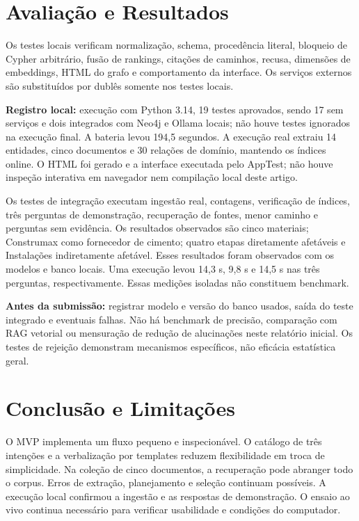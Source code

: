 \documentclass[conference]{IEEEtran}
\begin{document}
\section{Avaliação e Resultados}
Os testes locais verificam normalização, schema, procedência literal, bloqueio de Cypher arbitrário, fusão de rankings, citações de caminhos, recusa, dimensões de embeddings, HTML do grafo e comportamento da interface. Os serviços externos são substituídos por dublês somente nos testes locais.

\textbf{Registro local:} execução com Python 3.14, 19 testes aprovados, sendo 17 sem serviços e dois integrados com Neo4j e Ollama locais; não houve testes ignorados na execução final. A bateria levou 194,5 segundos. A execução real extraiu 14 entidades, cinco documentos e 30 relações de domínio, mantendo os índices online. O HTML foi gerado e a interface executada pelo AppTest; não houve inspeção interativa em navegador nem compilação local deste artigo.

Os testes de integração executam ingestão real, contagens, verificação de índices, três perguntas de demonstração, recuperação de fontes, menor caminho e perguntas sem evidência. Os resultados observados são cinco materiais; Construmax como fornecedor de cimento; quatro etapas diretamente afetáveis e Instalações indiretamente afetável. Esses resultados foram observados com os modelos e banco locais. Uma execução levou 14,3 s, 9,8 s e 14,5 s nas três perguntas, respectivamente. Essas medições isoladas não constituem benchmark.

\textbf{Antes da submissão:} registrar modelo e versão do banco usados, saída do teste integrado e eventuais falhas. Não há benchmark de precisão, comparação com RAG vetorial ou mensuração de redução de alucinações neste relatório inicial. Os testes de rejeição demonstram mecanismos específicos, não eficácia estatística geral.

\section{Conclusão e Limitações}
O MVP implementa um fluxo pequeno e inspecionável. O catálogo de três intenções e a verbalização por templates reduzem flexibilidade em troca de simplicidade. Na coleção de cinco documentos, a recuperação pode abranger todo o corpus. Erros de extração, planejamento e seleção continuam possíveis. A execução local confirmou a ingestão e as respostas de demonstração. O ensaio ao vivo continua necessário para verificar usabilidade e condições do computador.
\end{document}
